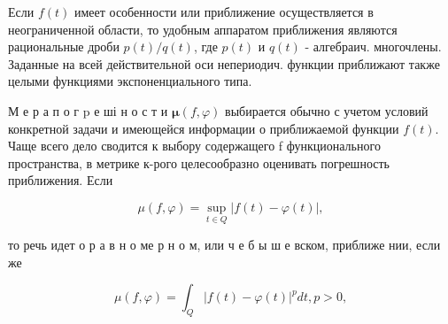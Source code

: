 \documentclass[10pt]{article}
\begin{document}
Если $f(t)$ имеет особенности или приближение осуществляется в неограниченной области, то удобным аппаратом приближения являются рациональные дроби $p(t) / q(t)$, где $p(t)$ и $q(t)$ - алгебраич. многочлены. Заданные на всей действительной оси непериодич. функции приближают также целыми функциями экспоненциального типа.



М е р а п о г p е ші н о с т и $\boldsymbol{\mu}(f, \varphi)$ выбирается обычно с учетом условий конкретной задачи и имеющейся информации о приближаемой функции $f(t)$. Чаще всего дело сводится к выбору содержащего f функционального пространства, в метрике к-рого целесообразно оценивать погрешность приближения. Если



\[

\mu(f, \varphi)=\sup _{t \in Q}|f(t)-\varphi(t)|,

\]



то речь идет о р а в н о ме р н о м, или ч е б ы ш е вском, приближе нии, если же



\[

\mu(f, \varphi)=\int_{Q}|f(t)-\varphi(t)|^{p} d t, p>0,

\]
\end{document}

